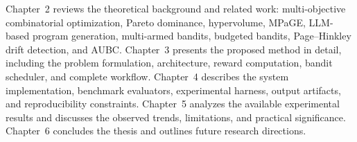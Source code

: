Chapter~2 reviews the theoretical background and related work: multi-objective combinatorial optimization, Pareto dominance, hypervolume, MPaGE, LLM-based program generation, multi-armed bandits, budgeted bandits, Page--Hinkley drift detection, and AUBC. Chapter~3 presents the proposed \bmab{} method in detail, including the problem formulation, architecture, reward computation, bandit scheduler, and complete workflow. Chapter~4 describes the system implementation, benchmark evaluators, experimental harness, output artifacts, and reproducibility constraints. Chapter~5 analyzes the available experimental results and discusses the observed trends, limitations, and practical significance. Chapter~6 concludes the thesis and outlines future research directions.
